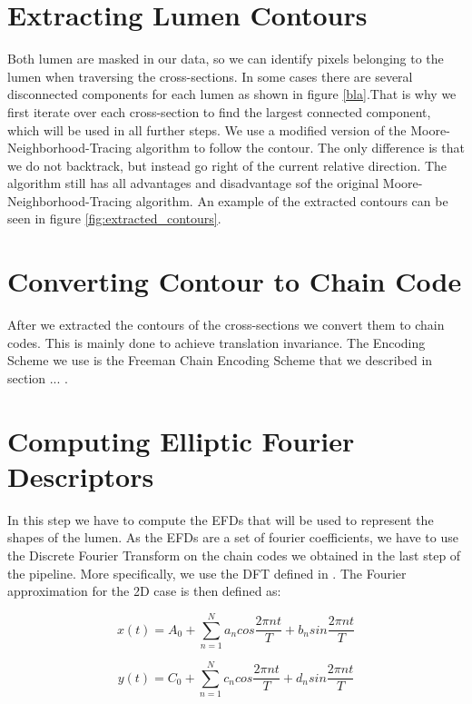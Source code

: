 \documentclass[thesis.tex]{subfiles}
\begin{document}
\section{Extracting Lumen Contours}
Both lumen are masked in our data, so we can identify pixels belonging to the lumen when traversing the cross-sections. In some cases there are several disconnected components for each lumen as shown in figure \ref{bla}.That is why we first iterate over each cross-section to find the largest connected component, which will be used  in all further steps. We use a modified version of the Moore-Neighborhood-Tracing algorithm to follow the contour. The only difference is that we do not backtrack, but instead go right of the current relative direction. The algorithm still has all advantages and disadvantage sof the original Moore-Neighborhood-Tracing algorithm. An example of the extracted contours can be seen in figure \ref{fig:extracted_contours}.

\section{Converting Contour to Chain Code}
After we extracted the contours of the cross-sections we convert them to chain codes. This is mainly done to achieve translation invariance. The Encoding Scheme we use is the Freeman Chain Encoding Scheme that we described in section ... . 

\section{Computing Elliptic Fourier Descriptors}
In this step we have to compute the EFDs that will be used to represent the shapes of the lumen. As the EFDs are a set of fourier coefficients, we have to use the Discrete Fourier Transform on the chain codes we obtained in the last step of the pipeline. More specifically, we use the DFT defined in \cite{giardinia}. The Fourier approximation for the 2D case is then defined as:

\begin{equation} \label{eq:dft_x}
 x(t) = A_0 + \sum_{n=1}^{N} a_n cos \frac{2\pi n t}{T} + b_n sin \frac{2\pi n t}{T}
\end{equation}


\begin{equation} \label{eq:dft_y}
 y(t) = C_0 + \sum_{n=1}^{N} c_n cos \frac{2\pi n t}{T} + d_n sin \frac{2\pi n t}{T}
\end{equation}
 
\end{document}
